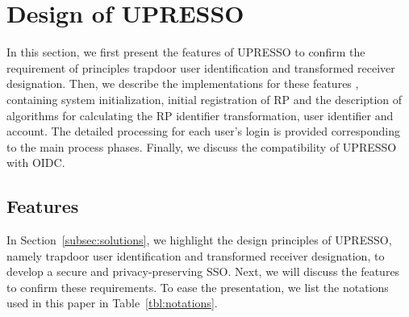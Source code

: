 \section{Design of UPRESSO}
\label{sec:UPRESSO}
In this section, we first present the features of UPRESSO to confirm the requirement of principles trapdoor user identification and transformed receiver designation. Then, we describe the implementations for these features , containing system initialization, initial registration of RP and the description of algorithms for calculating the RP identifier transformation, user identifier and account. The detailed processing for each user's login is provided corresponding to the main process phases. Finally, we discuss the compatibility of UPRESSO with OIDC.

\subsection{Features}
\label{subsec:overview}

In Section~\ref{subsec:solutions}, we highlight the design principles of UPRESSO, namely trapdoor user identification and transformed receiver designation, to develop a secure and privacy-preserving SSO. Next, we will discuss the features to confirm these requirements.
To ease the presentation, we list the notations used in this paper in Table~\ref{tbl:notations}.


